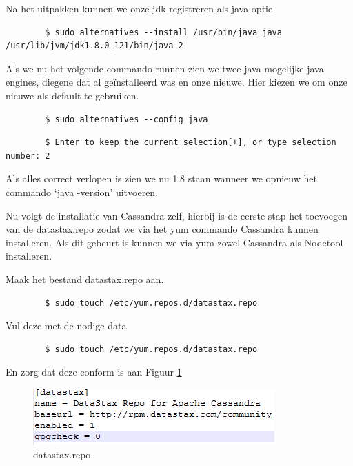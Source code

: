 \documentclass{article}
\begin{document}
	\par
	Na het uitpakken kunnen we onze jdk registreren als java optie
	\begin{lstlisting}
		$ sudo alternatives --install /usr/bin/java java /usr/lib/jvm/jdk1.8.0_121/bin/java 2
	\end{lstlisting}
	
	\par
	Als we nu het volgende commando runnen zien we twee java mogelijke java engines, diegene dat al geïnstalleerd was en onze nieuwe. 
	Hier kiezen we om onze nieuwe als default te gebruiken.
	\begin{lstlisting}
		$ sudo alternatives --config java
	\end{lstlisting}
	\begin{lstlisting}
		$ Enter to keep the current selection[+], or type selection number: 2
	\end{lstlisting}
	
	\par
	Als alles correct verlopen is zien we nu 1.8 staan wanneer we opnieuw het commando ‘java -version’ uitvoeren.
	
	\par
	Nu volgt de installatie van Cassandra zelf, hierbij is de eerste stap het toevoegen van de datastax.repo zodat we via het yum commando Cassandra kunnen installeren.
	 Als dit gebeurt is kunnen we via yum zowel Cassandra als Nodetool installeren.
	\par
	Maak het bestand datastax.repo aan.
	\begin{lstlisting}
		$ sudo touch /etc/yum.repos.d/datastax.repo
	\end{lstlisting}
	\par
	Vul deze met de nodige data
	\begin{lstlisting}
		$ sudo touch /etc/yum.repos.d/datastax.repo
	\end{lstlisting}
	En zorg dat deze conform is aan Figuur \ref{fig:datastax.repo}
	\begin{figure}[h!]
  		\includegraphics[width=\linewidth]{images/datastax-repo.PNG}
  		\caption{datastax.repo}
  		\label{fig:datastax.repo}
	\end{figure}
	
\end{document}

